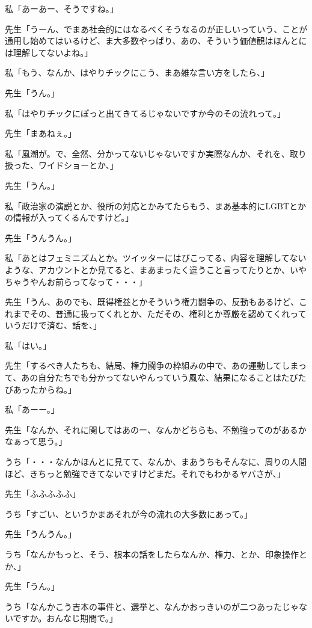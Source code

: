 \documentclass[b5j,twoside,twocolumn]{utarticle}
\begin{document}
\begin{description}
\item 私「あーあー、そうですね。」
\item 先生「うーん、でまあ社会的にはなるべくそうなるのが正しいっていう、ことが通用し始めてはいるけど、ま大多数やっぱり、あの、そういう価値観はほんとには理解してないよね。」
\item 私「もう、なんか、はやりチックにこう、まあ雑な言い方をしたら、」
\item 先生「うん。」
\item 私「はやりチックにぽっと出てきてるじゃないですか今のその流れって。」
\item 先生「まあねぇ。」
\item 私「風潮が。で、全然、分かってないじゃないですか実際なんか、それを、取り扱った、ワイドショーとか、」
\item 先生「うん。」
\item 私「政治家の演説とか、役所の対応とかみてたらもう、まあ基本的にLGBTとかの情報が入ってくるんですけど。」
\item 先生「うんうん。」
\item 私「あとはフェミニズムとか。ツイッターにはびこってる、内容を理解してないような、アカウントとか見てると、まあまったく違うこと言ってたりとか、いやちゃうやんお前らってなって・・・」
\item 先生「うん、あのでも、既得権益とかそういう権力闘争の、反動もあるけど、これまでその、普通に扱ってくれとか、ただその、権利とか尊厳を認めてくれっていうだけで済む、話を、」
\item 私「はい。」
\item 先生「するべき人たちも、結局、権力闘争の枠組みの中で、あの運動してしまって、あの自分たちでも分かってないやんっていう風な、結果になることはたびたびあったからね。」
\item 私「あーー。」
\item 先生「なんか、それに関してはあのー、なんかどちらも、不勉強ってのがあるかなぁって思う。」
\item うち「・・・なんかほんとに見てて、なんか、まあうちもそんなに、周りの人間ほど、きちっと勉強できてないですけどまだ。それでもわかるヤバさが、」
\item 先生「ふふふふふ」
\item うち「すごい、というかまあそれが今の流れの大多数にあって。」
\item 先生「うんうん。」
\item うち「なんかもっと、そう、根本の話をしたらなんか、権力、とか、印象操作とか、」
\item 先生「うん。」
\item うち「なんかこう吉本の事件と、選挙と、なんかおっきいのが二つあったじゃないですか。おんなじ期間で。」

\end{description}
\end{document}
